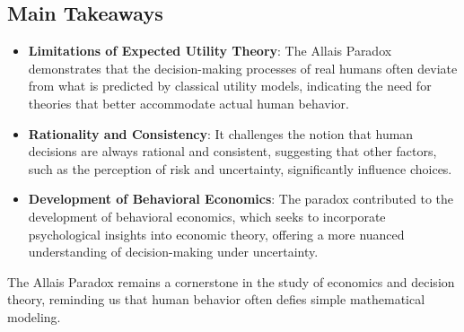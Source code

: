 \documentclass{article}
\begin{document}
\subsection{Main Takeaways}
\begin{itemize}
    \item \textbf{Limitations of Expected Utility Theory}: The Allais Paradox demonstrates that the decision-making processes of real humans often deviate from what is predicted by classical utility models, indicating the need for theories that better accommodate actual human behavior.
    \item \textbf{Rationality and Consistency}: It challenges the notion that human decisions are always rational and consistent, suggesting that other factors, such as the perception of risk and uncertainty, significantly influence choices.
    \item \textbf{Development of Behavioral Economics}: The paradox contributed to the development of behavioral economics, which seeks to incorporate psychological insights into economic theory, offering a more nuanced understanding of decision-making under uncertainty.
\end{itemize}

The Allais Paradox remains a cornerstone in the study of economics and decision theory, reminding us that human behavior often defies simple mathematical modeling.
\end{document}
